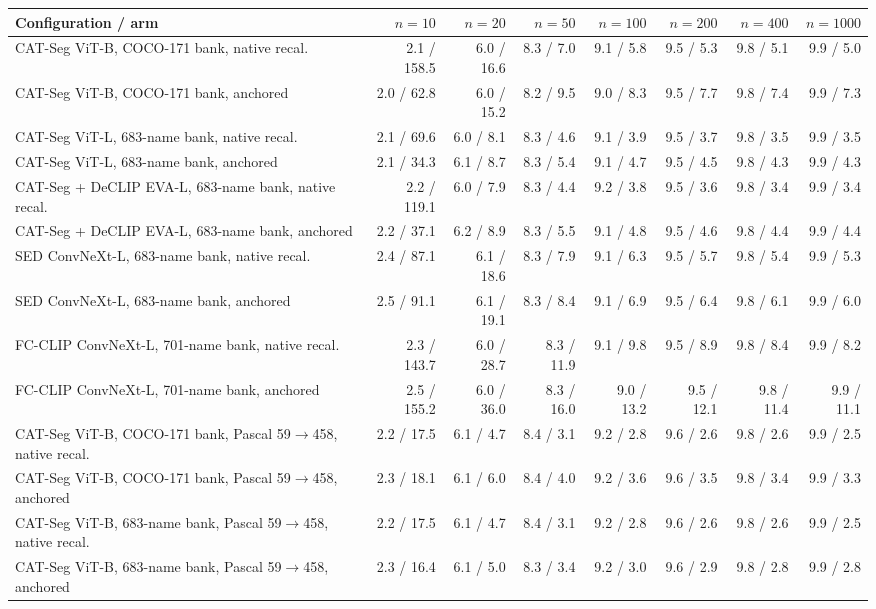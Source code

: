 \begin{tabular}{@{}lrrrrrrr@{}}
\toprule
Configuration / arm & $n=10$ & $n=20$ & $n=50$ & $n=100$ & $n=200$ & $n=400$ & $n=1000$ \\
\midrule
CAT-Seg ViT-B, COCO-171 bank, native recal. & 2.1 / 158.5 & 6.0 / 16.6 & 8.3 / 7.0 & 9.1 / 5.8 & 9.5 / 5.3 & 9.8 / 5.1 & 9.9 / 5.0 \\
CAT-Seg ViT-B, COCO-171 bank, anchored & 2.0 / 62.8 & 6.0 / 15.2 & 8.2 / 9.5 & 9.0 / 8.3 & 9.5 / 7.7 & 9.8 / 7.4 & 9.9 / 7.3 \\
CAT-Seg ViT-L, 683-name bank, native recal. & 2.1 / 69.6 & 6.0 / 8.1 & 8.3 / 4.6 & 9.1 / 3.9 & 9.5 / 3.7 & 9.8 / 3.5 & 9.9 / 3.5 \\
CAT-Seg ViT-L, 683-name bank, anchored & 2.1 / 34.3 & 6.1 / 8.7 & 8.3 / 5.4 & 9.1 / 4.7 & 9.5 / 4.5 & 9.8 / 4.3 & 9.9 / 4.3 \\
CAT-Seg + DeCLIP EVA-L, 683-name bank, native recal. & 2.2 / 119.1 & 6.0 / 7.9 & 8.3 / 4.4 & 9.2 / 3.8 & 9.5 / 3.6 & 9.8 / 3.4 & 9.9 / 3.4 \\
CAT-Seg + DeCLIP EVA-L, 683-name bank, anchored & 2.2 / 37.1 & 6.2 / 8.9 & 8.3 / 5.5 & 9.1 / 4.8 & 9.5 / 4.6 & 9.8 / 4.4 & 9.9 / 4.4 \\
SED ConvNeXt-L, 683-name bank, native recal. & 2.4 / 87.1 & 6.1 / 18.6 & 8.3 / 7.9 & 9.1 / 6.3 & 9.5 / 5.7 & 9.8 / 5.4 & 9.9 / 5.3 \\
SED ConvNeXt-L, 683-name bank, anchored & 2.5 / 91.1 & 6.1 / 19.1 & 8.3 / 8.4 & 9.1 / 6.9 & 9.5 / 6.4 & 9.8 / 6.1 & 9.9 / 6.0 \\
FC-CLIP ConvNeXt-L, 701-name bank, native recal. & 2.3 / 143.7 & 6.0 / 28.7 & 8.3 / 11.9 & 9.1 / 9.8 & 9.5 / 8.9 & 9.8 / 8.4 & 9.9 / 8.2 \\
FC-CLIP ConvNeXt-L, 701-name bank, anchored & 2.5 / 155.2 & 6.0 / 36.0 & 8.3 / 16.0 & 9.0 / 13.2 & 9.5 / 12.1 & 9.8 / 11.4 & 9.9 / 11.1 \\
CAT-Seg ViT-B, COCO-171 bank, Pascal 59$\to$458, native recal. & 2.2 / 17.5 & 6.1 / 4.7 & 8.4 / 3.1 & 9.2 / 2.8 & 9.6 / 2.6 & 9.8 / 2.6 & 9.9 / 2.5 \\
CAT-Seg ViT-B, COCO-171 bank, Pascal 59$\to$458, anchored & 2.3 / 18.1 & 6.1 / 6.0 & 8.4 / 4.0 & 9.2 / 3.6 & 9.6 / 3.5 & 9.8 / 3.4 & 9.9 / 3.3 \\
CAT-Seg ViT-B, 683-name bank, Pascal 59$\to$458, native recal. & 2.2 / 17.5 & 6.1 / 4.7 & 8.4 / 3.1 & 9.2 / 2.8 & 9.6 / 2.6 & 9.8 / 2.6 & 9.9 / 2.5 \\
CAT-Seg ViT-B, 683-name bank, Pascal 59$\to$458, anchored & 2.3 / 16.4 & 6.1 / 5.0 & 8.3 / 3.4 & 9.2 / 3.0 & 9.6 / 2.9 & 9.8 / 2.8 & 9.9 / 2.8 \\

\end{tabular}
